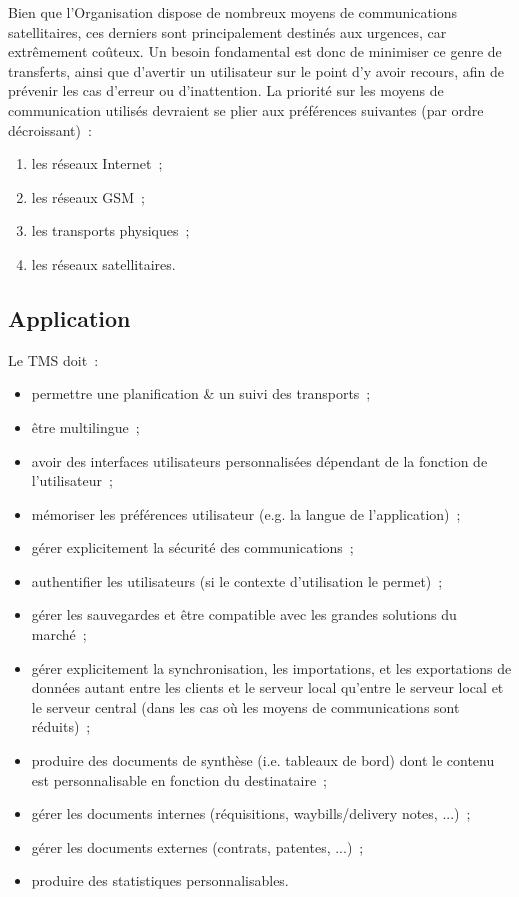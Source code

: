 \begin{constraint}
	Bien que l'Organisation dispose de nombreux moyens de communications satellitaires, ces derniers sont principalement destinés aux urgences, car extrêmement coûteux.
	Un besoin fondamental est donc de minimiser ce genre de transferts, ainsi que d'avertir un utilisateur sur le point d'y avoir recours, afin de prévenir les cas d'erreur ou d'inattention.
	La priorité sur les moyens de communication utilisés devraient se plier aux préférences suivantes (par ordre décroissant)~:
	\begin{enumerate}
		\item les réseaux Internet~;
		\item les réseaux GSM~;
		\item les transports physiques~;
		\item les réseaux satellitaires.
	\end{enumerate}
\end{constraint}

\subsection{Application}
Le TMS doit~:
\begin{itemize}
	\item permettre une planification \& un suivi des transports~;
	\item être multilingue~;
	\item avoir des interfaces utilisateurs personnalisées dépendant de la fonction de l'utilisateur~;
	\item mémoriser les préférences utilisateur (e.g. la langue de l'application)~;
	\item gérer explicitement la sécurité des communications~;
	\item authentifier les utilisateurs (si le contexte d'utilisation le permet)~;
	\item gérer les sauvegardes et être compatible avec les grandes solutions du marché~;
	\item gérer explicitement la synchronisation, les importations, et les exportations de données autant entre les clients et le serveur local qu'entre le serveur local et le serveur central (dans les cas où les moyens de communications sont réduits)~;
	\item produire des documents de synthèse (i.e. tableaux de bord) dont le contenu est personnalisable en fonction du destinataire~;
	\item gérer les documents internes (réquisitions, waybills/delivery notes, ...)~;
	\item gérer les documents externes (contrats, patentes, ...)~;
	\item produire des statistiques personnalisables.
\end{itemize}
